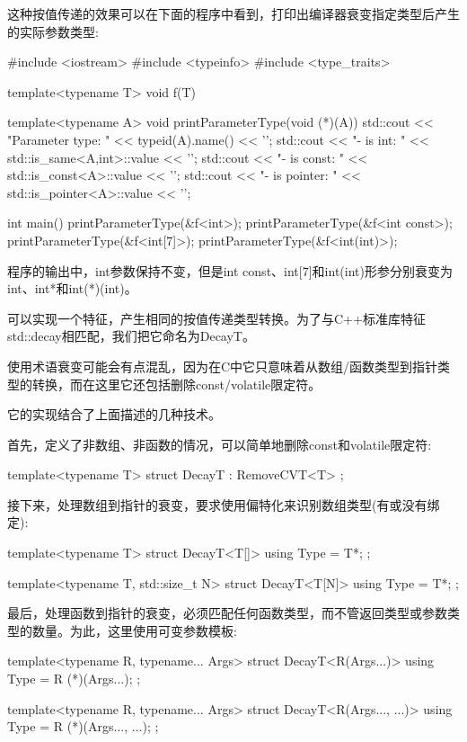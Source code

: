 这种按值传递的效果可以在下面的程序中看到，打印出编译器衰变指定类型后产生的实际参数类型:

\begin{cpp}
#include <iostream>
#include <typeinfo>
#include <type_traits>

template<typename T>
void f(T)
{ }

template<typename A>
void printParameterType(void (*)(A))
{
	std::cout << "Parameter type: " << typeid(A).name() << ’\n’;
	std::cout << "- is int: " << std::is_same<A,int>::value << ’\n’;
	std::cout << "- is const: " << std::is_const<A>::value << ’\n’;
	std::cout << "- is pointer: " << std::is_pointer<A>::value << ’\n’;
}

int main()
{
	printParameterType(&f<int>);
	printParameterType(&f<int const>);
	printParameterType(&f<int[7]>);
	printParameterType(&f<int(int)>);
}
\end{cpp}

程序的输出中，int参数保持不变，但是int const、int[7]和int(int)形参分别衰变为int、int*和int(*)(int)。

可以实现一个特征，产生相同的按值传递类型转换。为了与C++标准库特征std::decay相匹配，我们把它命名为DecayT。

\begin{notice}使用术语衰变可能会有点混乱，因为在C中它只意味着从数组/函数类型到指针类型的转换，而在这里它还包括删除const/volatile限定符。
\end{notice}

它的实现结合了上面描述的几种技术。

首先，定义了非数组、非函数的情况，可以简单地删除const和volatile限定符:

\begin{cpp}
template<typename T>
struct DecayT : RemoveCVT<T> {
};
\end{cpp}

接下来，处理数组到指针的衰变，要求使用偏特化来识别数组类型(有或没有绑定):

\begin{cpp}
template<typename T>
struct DecayT<T[]> {
	using Type = T*;
};

template<typename T, std::size_t N>
struct DecayT<T[N]> {
	using Type = T*;
};
\end{cpp}

最后，处理函数到指针的衰变，必须匹配任何函数类型，而不管返回类型或参数类型的数量。为此，这里使用可变参数模板:

\begin{cpp}
template<typename R, typename... Args>
struct DecayT<R(Args...)> {
	using Type = R (*)(Args...);
};

template<typename R, typename... Args>
struct DecayT<R(Args..., ...)> {
	using Type = R (*)(Args..., ...);
};
\end{cpp}

